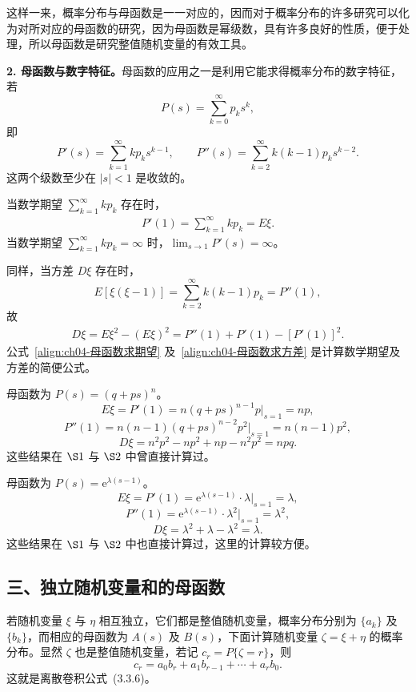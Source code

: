 \documentclass[../../main.tex]{subfiles}
\begin{document}
这样一来，概率分布与母函数是一一对应的，因而对于概率分布的许多研究可以化为对所对应的母函数的研究，因为母函数是幂级数，具有许多良好的性质，便于处理，所以母函数是研究整值随机变量的有效工具。

\textbf{2. 母函数与数字特征。}\quad 母函数的应用之一是利用它能求得概率分布的数字特征，若
\[
P(s)=\sum_{k=0}^{\infty}p_k s^k,
\]
即
\[
P'(s)=\sum_{k=1}^{\infty}kp_k s^{k-1},\qquad P''(s)=\sum_{k=2}^{\infty}k(k-1)p_k s^{k-2}.
\]
这两个级数至少在 $|s|<1$ 是收敛的。

当数学期望 $\sum_{k=1}^{\infty}kp_k$ 存在时，
\begin{align}
P'(1)=\sum_{k=1}^{\infty}kp_k=E\xi.\label{align:ch04-母函数求期望}
\end{align}
当数学期望 $\sum_{k=1}^{\infty}kp_k=\infty$ 时，$\lim_{s\to 1}P'(s)=\infty$。

同样，当方差 $D\xi$ 存在时，
\[
E[\xi(\xi-1)]=\sum_{k=2}^{\infty}k(k-1)p_k=P''(1),
\]
故
\begin{align}
D\xi=E\xi^2-(E\xi)^2=P''(1)+P'(1)-[P'(1)]^2.\label{align:ch04-母函数求方差}
\end{align}
公式~\eqref{align:ch04-母函数求期望} 及~\eqref{align:ch04-母函数求方差} 是计算数学期望及方差的简便公式。

\begin{example}[二项分布的数字特征]\label{example:ch04-二项数字特征}
母函数为 $P(s)=(q+ps)^n$。
\[
E\xi=P'(1)=n(q+ps)^{n-1}p\big|_{s=1}=np,
\]
\[
P''(1)=n(n-1)(q+ps)^{n-2}p^2\big|_{s=1}=n(n-1)p^2,
\]
\[
D\xi=n^2p^2-np^2+np-n^2p^2=npq.
\]
这些结果在 $\S 1$ 与 $\S 2$ 中曾直接计算过。
\end{example}

\begin{example}\label{example:ch04-Poisson数字特征}
母函数为 $P(s)=\mathrm{e}^{\lambda(s-1)}$。
\[
E\xi=P'(1)=\mathrm{e}^{\lambda(s-1)}\cdot\lambda\big|_{s=1}=\lambda,
\]
\[
P''(1)=\mathrm{e}^{\lambda(s-1)}\cdot\lambda^2\big|_{s=1}=\lambda^2,
\]
\[
D\xi=\lambda^2+\lambda-\lambda^2=\lambda.
\]
这些结果在 $\S 1$ 与 $\S 2$ 中也直接计算过，这里的计算较方便。
\end{example}

\subsection*{三、独立随机变量和的母函数}

若随机变量 $\xi$ 与 $\eta$ 相互独立，它们都是整值随机变量，概率分布分别为 $\{a_k\}$ 及 $\{b_k\}$，而相应的母函数为 $A(s)$ 及 $B(s)$，下面计算随机变量 $\zeta=\xi+\eta$ 的概率分布。显然 $\zeta$ 也是整值随机变量，若记 $c_r=P\{\zeta=r\}$，则
\[
c_r=a_0 b_r+a_1 b_{r-1}+\cdots+a_r b_0.
\]
这就是离散卷积公式~(3.3.6)。
\end{document}
